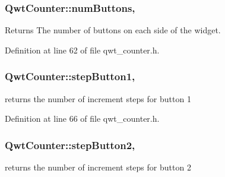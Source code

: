 \hypertarget{class_qwt_counter_a6a07ff0c9612ae4fb8a4acbb4466c0b6}{
\subsubsection[{num\-Buttons}]{ Qwt\-Counter\-::num\-Buttons\hspace{0.3cm}{\ttfamily [read]}, {\ttfamily [write]}}}\label{class_qwt_counter_a6a07ff0c9612ae4fb8a4acbb4466c0b6}
\begin{DoxyReturn}{Returns}
The number of buttons on each side of the widget. 
\end{DoxyReturn}


Definition at line 62 of file qwt\-\_\-counter.\-h.

\hypertarget{class_qwt_counter_a4cee5a93ef787068ed5b63bcb55167f6}{
\subsubsection[{step\-Button1}]{ Qwt\-Counter\-::step\-Button1\hspace{0.3cm}{\ttfamily [read]}, {\ttfamily [write]}}}\label{class_qwt_counter_a4cee5a93ef787068ed5b63bcb55167f6}


returns the number of increment steps for button 1 



Definition at line 66 of file qwt\-\_\-counter.\-h.

\hypertarget{class_qwt_counter_a3bf49238a71fc0edd6d7259a902997a5}{
\subsubsection[{step\-Button2}]{ Qwt\-Counter\-::step\-Button2\hspace{0.3cm}{\ttfamily [read]}, {\ttfamily [write]}}}\label{class_qwt_counter_a3bf49238a71fc0edd6d7259a902997a5}


returns the number of increment steps for button 2 




